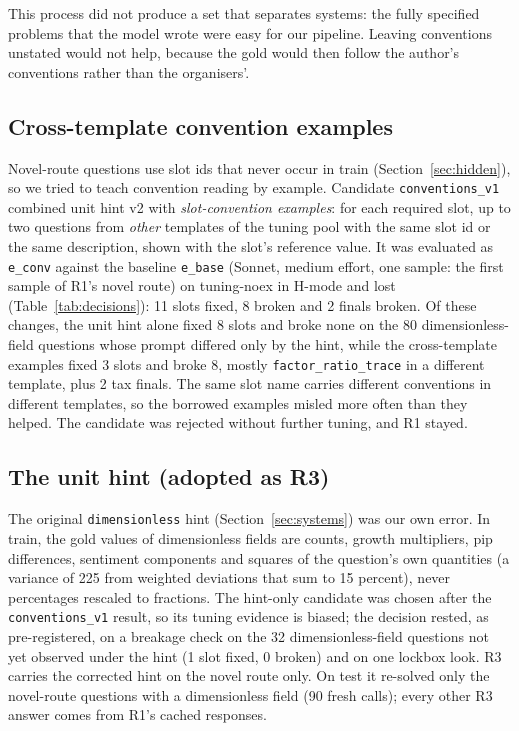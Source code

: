 \documentclass[conference]{IEEEtran}
\newcommand{\id}[1]{\texttt{#1}}
\begin{document}
This process did not produce a set that separates systems: the fully specified problems that the model wrote were easy for our pipeline. Leaving conventions unstated would not help, because the gold would then follow the author's conventions rather than the organisers'.

\subsection{Cross-template convention examples}
Novel-route questions use slot ids that never occur in train (Section~\ref{sec:hidden}), so we tried to teach convention reading by example. Candidate \id{conventions\_v1} combined unit hint v2 with \emph{slot-convention examples}: for each required slot, up to two questions from \emph{other} templates of the tuning pool with the same slot id or the same description, shown with the slot's reference value. It was evaluated as \id{e\_conv} against the baseline \id{e\_base} (Sonnet, medium effort, one sample: the first sample of R1's novel route) on tuning-noex in H-mode and lost (Table~\ref{tab:decisions}): 11 slots fixed, 8 broken and 2 finals broken. Of these changes, the unit hint alone fixed 8 slots and broke none on the 80 dimensionless-field questions whose prompt differed only by the hint, while the cross-template examples fixed 3 slots and broke 8, mostly \id{factor\_ratio\_trace} in a different template, plus 2 tax finals. The same slot name carries different conventions in different templates, so the borrowed examples misled more often than they helped. The candidate was rejected without further tuning, and R1 stayed.

\subsection{The unit hint (adopted as R3)}
The original \id{dimensionless} hint (Section~\ref{sec:systems}) was our own error. In train, the gold values of dimensionless fields are counts, growth multipliers, pip differences, sentiment components and squares of the question's own quantities (a variance of 225 from weighted deviations that sum to 15 percent), never percentages rescaled to fractions. The hint-only candidate was chosen after the \id{conventions\_v1} result, so its tuning evidence is biased; the decision rested, as pre-registered, on a breakage check on the 32 dimensionless-field questions not yet observed under the hint (1 slot fixed, 0 broken) and on one lockbox look. R3 carries the corrected hint on the novel route only. On test it re-solved only the novel-route questions with a dimensionless field (90 fresh calls); every other R3 answer comes from R1's cached responses.
\end{document}
